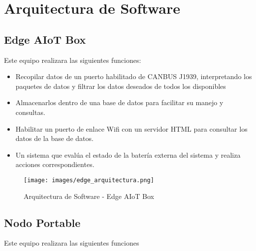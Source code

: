 
\renewcommand{\sectionTitle}{Arquitectura de Software}
\section{\sectionTitle}
\label{sec:section3}

\subsection{Edge AIoT Box}
\label{subsection:subsec3_1}

Este equipo realizara las siguientes funciones:

\begin{itemize}
    \item   Recopilar datos de un puerto habilitado de CANBUS J1939, interpretando los paquetes de datos y 
            filtrar los datos deseados de todos los disponibles
    \item   Almacenarlos dentro de una base de datos para facilitar su manejo y consultas.
    \item   Habilitar un puerto de enlace Wifi con un servidor HTML para consultar los datos de la base de datos.
    \item   Un sistema que evalúa el estado de la batería externa del sistema y realiza acciones correspondientes.
\end{itemize}

\begin{figure}[H]
    \centering
    \texttt{[image: images/edge\_arquitectura.png]}
    \captionsetup{font=footnotesize}
    \caption{Arquitectura de Software - Edge AIoT Box}
    \label{fig:img2}
\end{figure}

\subsection{Nodo Portable}
\label{subsection:subsec3_2}

Este equipo realizara las siguientes funciones

